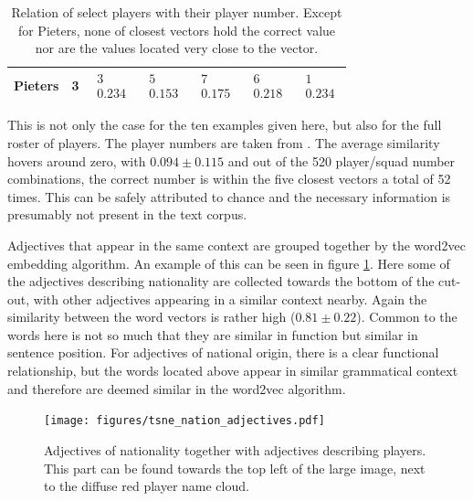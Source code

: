 \documentclass[10pt, a4paper]{UUThesisTemplate}
\begin{document}
\begin{table}[hb]
\begin{tabular}{r l c c c c c}
Pieters & 3 & $\begin{matrix} \text{3} \\ 0.234 \end{matrix}$  & $\begin{matrix} \text{5} \\ 0.153 \end{matrix}$  & $\begin{matrix} \text{7} \\ 0.175 \end{matrix}$  & $\begin{matrix} \text{6} \\ 0.218 \end{matrix}$  & $\begin{matrix} \text{1} \\ 0.234 \end{matrix}$\\\hline
\end{tabular}
\caption{Relation of select players with their player number. Except for Pieters, none of closest vectors hold the correct value nor are the values located very close to the vector.}\label{tab:playernumbers}
\end{table}

This is not only the case for the ten examples given here, but also for the full roster of players. The player numbers are taken from \cite{plnumbers}. The average similarity hovers around zero, with $0.094\pm0.115$ and out of the 520 player/squad number combinations, the correct number is within the five closest vectors a total of 52 times. This can be safely attributed to chance and the necessary information is presumably not present in the text corpus.

Adjectives that appear in the same context are grouped together by the word2vec embedding algorithm. An example of this can be seen in figure \ref{fig:tsnenations}. Here some of the adjectives describing nationality are collected towards the bottom of the cut-out, with other adjectives appearing in a similar context nearby. Again the similarity between the word vectors is rather high ($0.81\pm0.22$). Common to the words here is not so much that they are similar in function but similar in sentence position. For adjectives of national origin, there is a clear functional relationship, but the words located above appear in similar grammatical context and therefore are deemed similar in the word2vec algorithm.

\begin{figure}
\hspace{-1.5cm}
\texttt{[image: figures/tsne\_nation\_adjectives.pdf]}
\caption{Adjectives of nationality together with adjectives describing players. This part can be found towards the top left of the large image, next to the diffuse red player name cloud.}\label{fig:tsnenations}
\end{figure}
\end{document}
